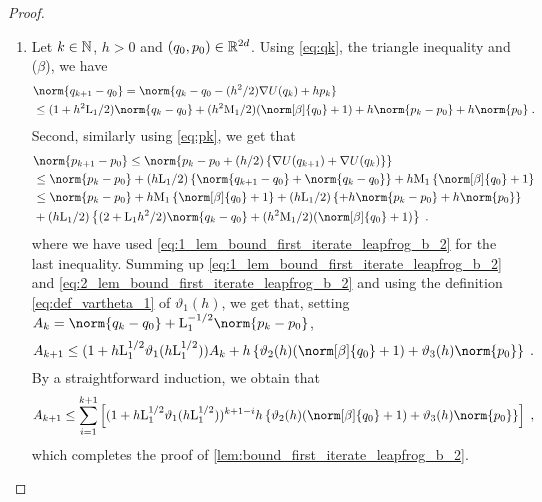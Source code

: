 \begin{proof}
\begin{enumerate}[label={(\roman*)},wide=0pt, labelindent=\parindent]
\begin{align}
&\quad \leq C_{k+1,1}h\defEns{1+\norm{p_0}^{\expozero}+\norm{q_0}^{\expozero}} + (C_{k+1,2}h/2)\defEns{1+ \norm{q_0}^{\expozero} + \norm{p_0}^{\expozero}} \eqsp.
\end{align}
Therefore, \eqref{lem:bound_first_iterate_leapfrog_1_q} is satisfied which concludes the induction and the proof.
\item Let $k \in \mathbb{N}$, $h >0$ and $(q_0, p_0) \in \mathbb{R}^{2d}$. Using \eqref{eq:qk}, the triangle inequality and ($\beta$), we have
  \begin{align}
\label{eq:1_lem_bound_first_iterate_leapfrog_b_2}
&    \norm{q_{k+1} - q_0}  = \norm{q_k - q_0 - (h^2/2) \nabla U(q_k) + h p_k} \\
\nonumber
&                          \leq (1+h^2 \constzero/2) \norm{q_k - q_0} + (h^2\constzeroT/2) (\norm[\beta]{q_0} +1) + h \norm{p_k-p_0} + h \norm{p_0}  \eqsp.
  \end{align}
Second, similarly using \eqref{eq:pk}, we get that
\begin{align}
\nonumber
&    \norm{p_{k+1} - p_0}   \leq  \norm{p_k-p_0 + (h/2) \defEns{\nabla U(q_{k+1}) + \nabla U(q_k)} } \\
    \nonumber
                         & \leq \norm{p_k - p_0} + (h \constzero/2) \defEns{ \norm{q_{k+1}- q_0} + \norm{q_k - q_0}} + h \constzeroT \defEns{\norm[\beta]{q_0} +1} \\
    \nonumber
                         & \leq \norm{p_k - p_0}  +  h \constzeroT \defEns{\norm[\beta]{q_0} +1} +(h \constzero/2) \defEns{  + h \norm{p_k-p_0} + h \norm{p_0}} \\
    \label{eq:2_lem_bound_first_iterate_leapfrog_b_2}
&     +(h \constzero/2) \defEns{ (2+\constzero h^2/2) \norm{q_k-q_0} + (h^2\constzeroT/2) (\norm[\beta]{q_0}+1)}  \eqsp.
  \end{align}
  where we have used \eqref{eq:1_lem_bound_first_iterate_leapfrog_b_2} for the last inequality.
  Summing up \eqref{eq:1_lem_bound_first_iterate_leapfrog_b_2} and \eqref{eq:2_lem_bound_first_iterate_leapfrog_b_2} and using the definition \eqref{eq:def_vartheta_1} of $\vartheta_1(h)$, we get that, setting $A_k= \norm{q_k-q_0}  + \constzero^{-1/2} \norm{p_k-p_0}$,
  \[
  A_{k+1} \leq (1+h\constzero^{1/2}\vartheta_1(h\constzero^{1/2})) A_k    + h \defEns{ \vartheta_2(h) (\norm[\beta]{q_0} +1) +  \vartheta_3(h) \norm{p_0}} \eqsp.
\]
  By a straightforward induction, we obtain that
  \begin{equation}
    A_{k+1} \leq \sum_{i=1}^{k+1} \parentheseDeux{(1+h \constzero^{1/2} \vartheta_1(h \constzero^{1/2} ))^{k+1-i} h \defEns{ \vartheta_2(h) (\norm[\beta]{q_0} +1) +  \vartheta_3(h) \norm{p_0} }} \eqsp,
  \end{equation}
  which completes the proof of \ref{lem:bound_first_iterate_leapfrog_b_2}.
\end{enumerate}
\end{proof}

